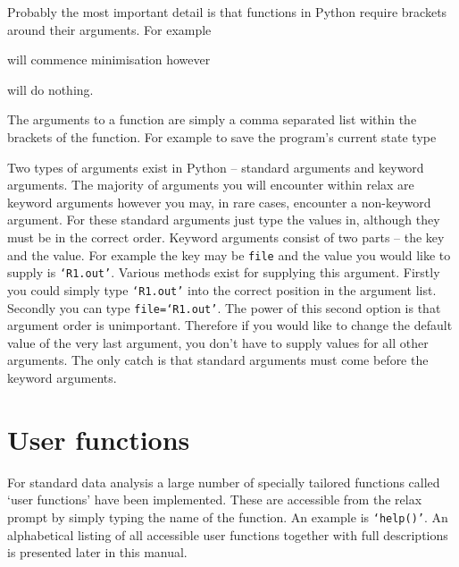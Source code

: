 Probably the most important detail is that functions in Python require brackets around their arguments.  For example


will commence minimisation however


will do nothing.

The arguments to a function are simply a comma separated list within the brackets of the function.  For example to save the program's current state type


Two types of arguments exist in Python -- standard arguments and keyword arguments.  The majority of arguments you will encounter within relax are keyword arguments however you may, in rare cases, encounter a non-keyword argument.  For these standard arguments just type the values in, although they must be in the correct order.  Keyword arguments consist of two parts -- the key and the value.  For example the key may be \texttt{file} and the value you would like to supply is \texttt{`R1.out'}.  Various methods exist for supplying this argument.  Firstly you could simply type \texttt{`R1.out'} into the correct position in the argument list.  Secondly you can type \texttt{file=`R1.out'}.  The power of this second option is that argument order is unimportant.  Therefore if you would like to change the default value of the very last argument, you don't have to supply values for all other arguments.  The only catch is that standard arguments must come before the keyword arguments.




\section{User functions}

For standard data analysis a large number of specially tailored functions called `user functions' have been implemented.  These are accessible from the relax prompt by simply typing the name of the function.  An example is \texttt{`help()'}.  An alphabetical listing of all accessible user functions together with full descriptions is presented later in this manual.

